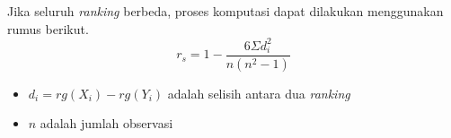 \noindent Jika seluruh \textit{ranking} berbeda, proses komputasi dapat dilakukan menggunakan rumus berikut.
\begin{equation}
r_s = 1-\frac{6 \Sigma d_i^2}{n(n^2-1)}
\end{equation}
\begin{itemize}
  \item $d_i = rg(X_i)-rg(Y_i)$ adalah selisih antara dua \textit{ranking}
  \item $n$ adalah jumlah observasi
\end{itemize}



